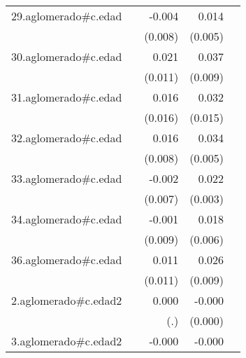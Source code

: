 {\begin{longtable}{l*{4}{D{.}{.}{-1}}}
\addlinespace
29.aglomerado#c.edad&                     &      -0.004         &       0.014\sym{**} &                     \\
            &                     &     (0.008)         &     (0.005)         &                     \\
\addlinespace
30.aglomerado#c.edad&                     &       0.021         &       0.037\sym{***}&                     \\
            &                     &     (0.011)         &     (0.009)         &                     \\
\addlinespace
31.aglomerado#c.edad&                     &       0.016         &       0.032\sym{*}  &                     \\
            &                     &     (0.016)         &     (0.015)         &                     \\
\addlinespace
32.aglomerado#c.edad&                     &       0.016\sym{*}  &       0.034\sym{***}&                     \\
            &                     &     (0.008)         &     (0.005)         &                     \\
\addlinespace
33.aglomerado#c.edad&                     &      -0.002         &       0.022\sym{***}&                     \\
            &                     &     (0.007)         &     (0.003)         &                     \\
\addlinespace
34.aglomerado#c.edad&                     &      -0.001         &       0.018\sym{**} &                     \\
            &                     &     (0.009)         &     (0.006)         &                     \\
\addlinespace
36.aglomerado#c.edad&                     &       0.011         &       0.026\sym{**} &                     \\
            &                     &     (0.011)         &     (0.009)         &                     \\
\addlinespace
2.aglomerado#c.edad2&                     &       0.000         &      -0.000         &                     \\
            &                     &         (.)         &     (0.000)         &                     \\
\addlinespace
3.aglomerado#c.edad2&                     &      -0.000\sym{*}  &      -0.000\sym{***}&                     \\

\end{longtable}}
